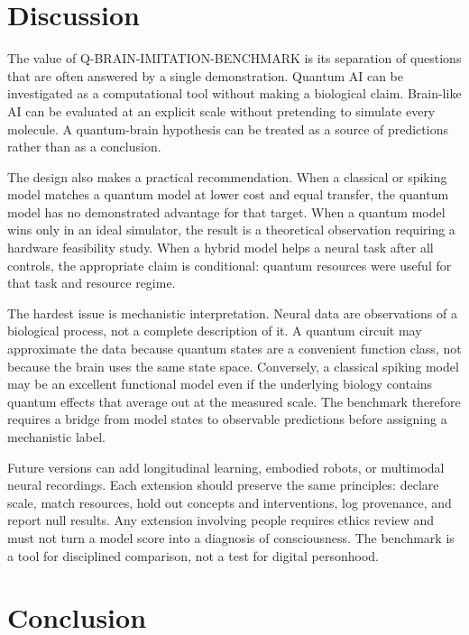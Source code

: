 \documentclass[conference]{IEEEtran}
\begin{document}
\section{Discussion}
\label{sec:discussion}

The value of Q-BRAIN-IMITATION-BENCHMARK is its separation of questions that are often
answered by a single demonstration. Quantum AI can be investigated as a computational
tool without making a biological claim. Brain-like AI can be evaluated at an explicit
scale without pretending to simulate every molecule. A quantum-brain hypothesis can be
treated as a source of predictions rather than as a conclusion.

The design also makes a practical recommendation. When a classical or spiking model
matches a quantum model at lower cost and equal transfer, the quantum model has no
demonstrated advantage for that target. When a quantum model wins only in an ideal
simulator, the result is a theoretical observation requiring a hardware feasibility
study. When a hybrid model helps a neural task after all controls, the appropriate claim
is conditional: quantum resources were useful for that task and resource regime.

The hardest issue is mechanistic interpretation. Neural data are observations of a
biological process, not a complete description of it. A quantum circuit may approximate
the data because quantum states are a convenient function class, not because the brain
uses the same state space. Conversely, a classical spiking model may be an excellent
functional model even if the underlying biology contains quantum effects that average
out at the measured scale. The benchmark therefore requires a bridge from model states
to observable predictions before assigning a mechanistic label.

Future versions can add longitudinal learning, embodied robots, or multimodal neural
recordings. Each extension should preserve the same principles: declare scale, match
resources, hold out concepts and interventions, log provenance, and report null results.
Any extension involving people requires ethics review and must not turn a model score
into a diagnosis of consciousness. The benchmark is a tool for disciplined comparison,
not a test for digital personhood.

\section{Conclusion}
\label{sec:conclusion}
\end{document}
